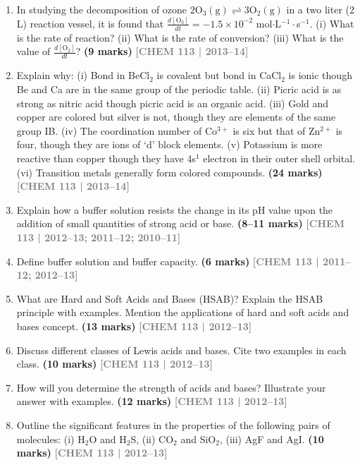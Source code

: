 \documentclass[12pt,a3paper]{article}
\newcommand{\yr}[1]{\hfill\textcolor{gray}{\small\textbf{[#1]}}}
\newcommand{\mk}[1]{\textcolor{orange!70!black}{\small\textbf{(#1 marks)}}}
\begin{document}
\begin{enumerate}
\item In studying the decomposition of ozone $2\text{O}_3(\text{g}) \rightleftharpoons 3\text{O}_2(\text{g})$ in a two liter (2 L) reaction vessel, it is found that $\frac{d[\text{O}_3]}{dt} = -1.5 \times 10^{-2}$ mol$\cdot$L$^{-1}\cdot$s$^{-1}$. (i) What is the rate of reaction? (ii) What is the rate of conversion? (iii) What is the value of $\frac{d[\text{O}_2]}{dt}$? \mk{9}
\yr{CHEM 113 | 2013--14}

\item Explain why: (i) Bond in BeCl$_2$ is covalent but bond in CaCl$_2$ is ionic though Be and Ca are in the same group of the periodic table. (ii) Picric acid is as strong as nitric acid though picric acid is an organic acid. (iii) Gold and copper are colored but silver is not, though they are elements of the same group IB. (iv) The coordination number of Co$^{3+}$ is six but that of Zn$^{2+}$ is four, though they are ions of `d' block elements. (v) Potassium is more reactive than copper though they have 4s$^1$ electron in their outer shell orbital. (vi) Transition metals generally form colored compounds. \mk{24}
\yr{CHEM 113 | 2013--14}

\item Explain how a buffer solution resists the change in its pH value upon the addition of small quantities of strong acid or base. \mk{8--11}
\yr{CHEM 113 | 2012--13; 2011--12; 2010--11}

\item Define buffer solution and buffer capacity. \mk{6}
\yr{CHEM 113 | 2011--12; 2012--13}

\item What are Hard and Soft Acids and Bases (HSAB)? Explain the HSAB principle with examples. Mention the applications of hard and soft acids and bases concept. \mk{13}
\yr{CHEM 113 | 2012--13}

\item Discuss different classes of Lewis acids and bases. Cite two examples in each class. \mk{10}
\yr{CHEM 113 | 2012--13}

\item How will you determine the strength of acids and bases? Illustrate your answer with examples. \mk{12}
\yr{CHEM 113 | 2012--13}

\item Outline the significant features in the properties of the following pairs of molecules: (i) H$_2$O and H$_2$S, (ii) CO$_2$ and SiO$_2$, (iii) AgF and AgI. \mk{10}
\yr{CHEM 113 | 2012--13}


\end{enumerate}
\end{document}
